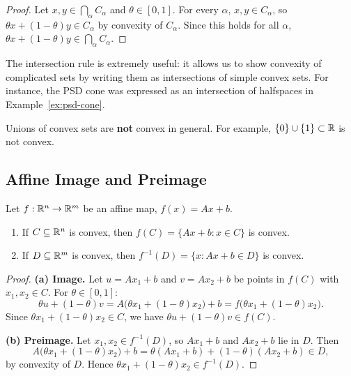 \documentclass[11pt,a4paper]{article}
\begin{document}
\begin{proof}
Let $x, y \in \bigcap_\alpha C_\alpha$ and $\theta \in [0,1]$.  For every
$\alpha$, $x, y \in C_\alpha$, so $\theta x + (1-\theta) y \in C_\alpha$
by convexity of $C_\alpha$.  Since this holds for all $\alpha$,
$\theta x + (1-\theta) y \in \bigcap_\alpha C_\alpha$.
\end{proof}

\begin{remark}
The intersection rule is extremely useful: it allows us to show convexity of
complicated sets by writing them as intersections of simple convex sets.  For
instance, the PSD cone was expressed as an intersection of halfspaces in
Example~\ref{ex:psd-cone}.
\end{remark}

\begin{warning}
Unions of convex sets are \textbf{not} convex in general.  For example,
$\{0\} \cup \{1\} \subset \mathbb{R}$ is not convex.
\end{warning}

\subsection{Affine Image and Preimage}

\begin{proposition}
\label{prop:affine-image}
Let $f : \mathbb{R}^n \to \mathbb{R}^m$ be an affine map, $f(x) = Ax + b$.
\begin{enumerate}[label=(\alph*)]
  \item If $C \subseteq \mathbb{R}^n$ is convex, then $f(C) = \{Ax + b : x \in C\}$
        is convex.
  \item If $D \subseteq \mathbb{R}^m$ is convex, then $f^{-1}(D) = \{x : Ax + b \in
        D\}$ is convex.
\end{enumerate}
\end{proposition}

\begin{proof}
\textbf{(a) Image.}  Let $u = Ax_1 + b$ and $v = Ax_2 + b$ be points in
$f(C)$ with $x_1, x_2 \in C$.  For $\theta \in [0,1]$:
\[
  \theta u + (1-\theta) v
  = A\bigl(\theta x_1 + (1-\theta) x_2\bigr) + b
  = f\bigl(\theta x_1 + (1-\theta) x_2\bigr).
\]
Since $\theta x_1 + (1-\theta) x_2 \in C$, we have
$\theta u + (1-\theta) v \in f(C)$.

\textbf{(b) Preimage.}  Let $x_1, x_2 \in f^{-1}(D)$, so $Ax_1 + b$ and
$Ax_2 + b$ lie in $D$.  Then
\[
  A\bigl(\theta x_1 + (1-\theta) x_2\bigr) + b
  = \theta(Ax_1 + b) + (1-\theta)(Ax_2 + b) \in D,
\]
by convexity of $D$.  Hence $\theta x_1 + (1-\theta) x_2 \in f^{-1}(D)$.
\end{proof}
\end{document}
